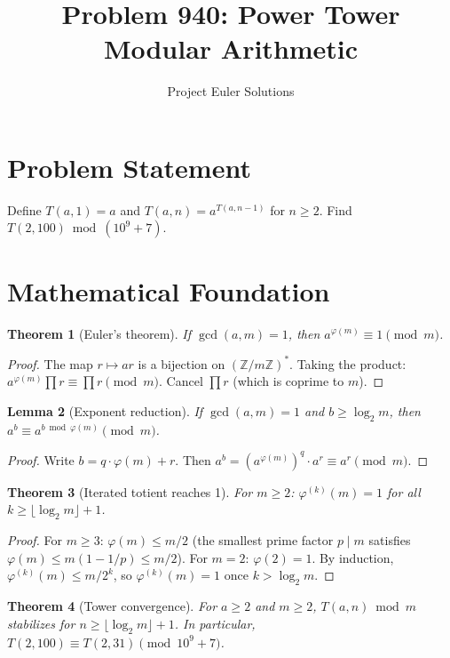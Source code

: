 \documentclass[11pt]{article}
\title{Problem 940: Power Tower Modular Arithmetic}
\author{Project Euler Solutions}
\date{}
\newtheorem{theorem}{Theorem}
\newtheorem{lemma}[theorem]{Lemma}
\theoremstyle{definition}
\begin{document}
\maketitle

\section{Problem Statement}

Define $T(a, 1) = a$ and $T(a, n) = a^{T(a, n-1)}$ for $n \geq 2$. Find $T(2, 100) \bmod (10^9 + 7)$.

\section{Mathematical Foundation}

\begin{theorem}[Euler's theorem]
If $\gcd(a, m) = 1$, then $a^{\varphi(m)} \equiv 1 \pmod{m}$.
\end{theorem}

\begin{proof}
The map $r \mapsto ar$ is a bijection on $(\mathbb{Z}/m\mathbb{Z})^*$. Taking the product: $a^{\varphi(m)} \prod r \equiv \prod r \pmod{m}$. Cancel $\prod r$ (which is coprime to $m$).
\end{proof}

\begin{lemma}[Exponent reduction]
If $\gcd(a, m) = 1$ and $b \geq \log_2 m$, then $a^b \equiv a^{b \bmod \varphi(m)} \pmod{m}$.
\end{lemma}

\begin{proof}
Write $b = q \cdot \varphi(m) + r$. Then $a^b = (a^{\varphi(m)})^q \cdot a^r \equiv a^r \pmod{m}$.
\end{proof}

\begin{theorem}[Iterated totient reaches 1]
For $m \geq 2$: $\varphi^{(k)}(m) = 1$ for all $k \geq \lfloor \log_2 m \rfloor + 1$.
\end{theorem}

\begin{proof}
For $m \geq 3$: $\varphi(m) \leq m/2$ (the smallest prime factor $p \mid m$ satisfies $\varphi(m) \leq m(1 - 1/p) \leq m/2$). For $m = 2$: $\varphi(2) = 1$. By induction, $\varphi^{(k)}(m) \leq m/2^k$, so $\varphi^{(k)}(m) = 1$ once $k > \log_2 m$.
\end{proof}

\begin{theorem}[Tower convergence]
For $a \geq 2$ and $m \geq 2$, $T(a, n) \bmod m$ stabilizes for $n \geq \lfloor \log_2 m \rfloor + 1$. In particular, $T(2, 100) \equiv T(2, 31) \pmod{10^9 + 7}$.
\end{theorem}
\end{document}
